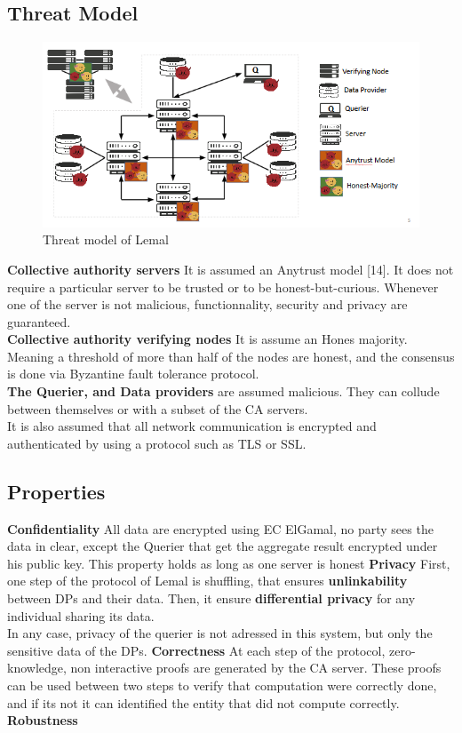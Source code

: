 \documentclass{article}
\begin{document}
\subsection{Threat Model}
\begin{figure}[H]
\center
\includegraphics[scale=0.75]{img/threatLemal.png}
\caption{Threat model of Lemal}
\end{figure}
\textbf{Collective authority servers} It is assumed an Anytrust model [14]. It does not require a particular server to be trusted or to be honest-but-curious. Whenever one of the server is not malicious, functionnality, security and privacy are guaranteed.\\
\textbf{Collective authority verifying nodes} It is assume an Hones majority. Meaning a threshold of more than half of the nodes are honest, and the consensus is done via Byzantine fault tolerance protocol.\\
\textbf{The Querier, and Data providers} are assumed malicious. They can collude between themselves or with a subset of the CA servers.\\
It is also assumed that all network communication is encrypted and authenticated by using a protocol such as TLS or SSL.
\subsection{Properties}
\textbf{Confidentiality} All data are encrypted using EC ElGamal, no party sees the data in clear, except the Querier that get the aggregate result encrypted under his public key. This property holds as long as one server is honest
\textbf{Privacy} First, one step of the protocol of Lemal is shuffling, that ensures \textbf{unlinkability} between DPs and their data. Then, it ensure \textbf{differential privacy} for any individual sharing its data.\\
In any case, privacy of the querier is not adressed in this system, but only the sensitive data of the DPs.
\textbf{Correctness} At each step of the protocol, zero-knowledge, non interactive proofs are generated by the CA server. These proofs can be used between two steps to verify that computation were correctly done, and if its not it can identified the entity that did not compute correctly.
\textbf{Robustness}
\end{document}
